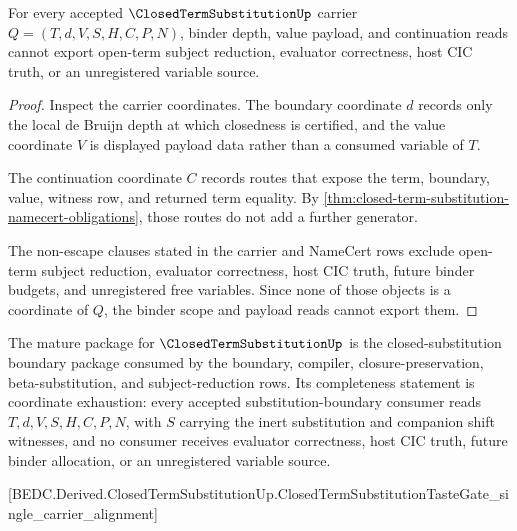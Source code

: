 \begin{theorem}
\label{thm:closed-substitution-binder-scope-nonescape}
For every accepted $\ClosedTermSubstitutionUp$ carrier $Q=(T,d,V,S,H,C,P,N)$, binder depth, value payload, and continuation reads cannot export open-term subject reduction, evaluator correctness, host CIC truth, or an unregistered variable source.
\end{theorem}
\begin{proof}
Inspect the carrier coordinates. The boundary coordinate $d$ records only the local de Bruijn depth at which closedness is certified, and the value coordinate $V$ is displayed payload data rather than a consumed variable of $T$.

The continuation coordinate $C$ records routes that expose the term, boundary, value, witness row, and returned term equality. By \autoref{thm:closed-term-substitution-namecert-obligations}, those routes do not add a further generator.

The non-escape clauses stated in the carrier and NameCert rows exclude open-term subject reduction, evaluator correctness, host CIC truth, future binder budgets, and unregistered free variables. Since none of those objects is a coordinate of $Q$, the binder scope and payload reads cannot export them.
\end{proof}

The mature package for $\ClosedTermSubstitutionUp$ is the closed-substitution boundary package consumed by the boundary, compiler, closure-preservation, beta-substitution, and subject-reduction rows. Its completeness statement is coordinate exhaustion: every accepted substitution-boundary consumer reads $T,d,V,S,H,C,P,N$, with $S$ carrying the inert substitution and companion shift witnesses, and no consumer receives evaluator correctness, host CIC truth, future binder allocation, or an unregistered variable source.

[BEDC.Derived.ClosedTermSubstitutionUp.ClosedTermSubstitutionTasteGate\_single\_carrier\_alignment]

